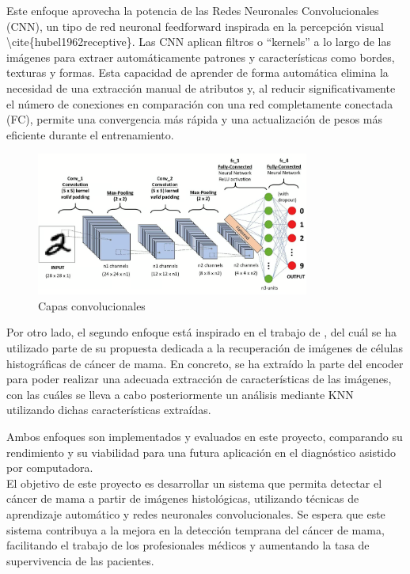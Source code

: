 \documentclass[12pt]{article} %
\begin{document}
Este enfoque aprovecha la potencia de las Redes Neuronales Convolucionales (CNN), un tipo de red neuronal feedforward inspirada en la percepción visual \textbackslash{}cite\{hubel1962receptive\}. Las CNN aplican filtros o “kernels” a lo largo de las imágenes para extraer automáticamente patrones y características como bordes, texturas y formas. Esta capacidad de aprender de forma automática elimina la necesidad de una extracción manual de atributos y, al reducir significativamente el número de conexiones en comparación con una red completamente conectada (FC), permite una convergencia más rápida y una actualización de pesos más eficiente durante el entrenamiento.

\begin{figure}[!ht]
    \centering
    \includegraphics[width=0.8\textwidth]{CNN.png}
    \caption{Capas convolucionales \cite{datacamp_cnn}}
    \label{fig:capas_convolucionales}
\end{figure}

Por otro lado, el segundo enfoque está inspirado en el trabajo de \cite{bardou2018classification}, del cuál se ha utilizado parte de su propuesta dedicada a la recuperación de imágenes de células histográficas de cáncer de mama. En concreto, se ha extraído la parte del encoder para poder realizar una adecuada extracción de características de las imágenes, con las cuáles se lleva a cabo posteriormente un análisis mediante KNN utilizando dichas características extraídas.

\newpage
Ambos enfoques son implementados y evaluados en este proyecto, comparando su rendimiento y su viabilidad para una futura aplicación en el diagnóstico asistido por computadora.\\

El objetivo de este proyecto es desarrollar un sistema que permita detectar el cáncer de mama a partir de imágenes histológicas, utilizando técnicas de aprendizaje automático y redes neuronales convolucionales. Se espera que este sistema contribuya a la mejora en la detección temprana del cáncer de mama, facilitando el trabajo de los profesionales médicos y aumentando la tasa de supervivencia de las pacientes.
\end{document}
